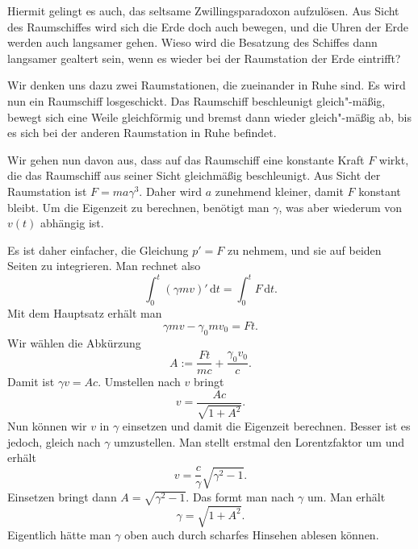\documentclass[a4paper,11pt,fleqn,twocolumn,twoside]{scrartcl}
\begin{document}
Hiermit gelingt es auch, das seltsame Zwillingsparadoxon aufzulösen.
Aus Sicht des Raumschiffes wird sich die Erde doch auch bewegen, und
die Uhren der Erde werden auch langsamer gehen. Wieso wird die
Besatzung des Schiffes dann langsamer gealtert sein, wenn es wieder
bei der Raumstation der Erde eintrifft?

Wir denken uns dazu zwei Raumstationen, die zueinander in Ruhe sind.
Es wird nun ein Raumschiff losgeschickt. Das Raumschiff beschleunigt
gleich"-mäßig, bewegt sich eine Weile gleichförmig und bremst dann
wieder gleich"-mäßig ab, bis es sich bei der anderen Raumstation
in Ruhe befindet.

Wir gehen nun davon aus, dass auf das Raumschiff eine konstante
Kraft $F$ wirkt, die das Raumschiff aus seiner Sicht gleichmäßig
beschleunigt. Aus Sicht der Raumstation ist $F=ma\gamma^3$. Daher
wird $a$ zunehmend kleiner, damit $F$ konstant bleibt. Um die
Eigenzeit zu berechnen, benötigt man $\gamma$, was aber wiederum
von $v(t)$ abhängig ist.

Es ist daher einfacher, die Gleichung $p'=F$ zu nehmem, und sie auf
beiden Seiten zu integrieren. Man rechnet also%
\[\int_0^t (\gamma mv)'\,\mathrm dt = \int_0^t F\,\mathrm dt.\]
Mit dem Hauptsatz erhält man%
\[\gamma mv-\gamma_0mv_0 = Ft.\]
Wir wählen die Abkürzung%
\[A:=\frac{Ft}{mc}+\frac{\gamma_0v_0}{c}.\]
Damit ist $\gamma v = Ac$. Umstellen nach $v$ bringt%
\[v = \frac{Ac}{\sqrt{1+A^2}}.\]
Nun können wir $v$ in $\gamma$ einsetzen und damit die Eigenzeit
berechnen. Besser ist es jedoch, gleich nach $\gamma$ umzustellen.
Man stellt erstmal den Lorentzfaktor um und erhält%
\[v = \frac{c}{\gamma}\sqrt{\gamma^2-1}.\]
Einsetzen bringt dann $A=\sqrt{\gamma^2-1}$. Das formt man nach
$\gamma$ um. Man erhält%
\[\gamma=\sqrt{1+A^2}.\]
Eigentlich hätte man $\gamma$ oben auch durch scharfes Hinsehen
ablesen können.
\end{document}

